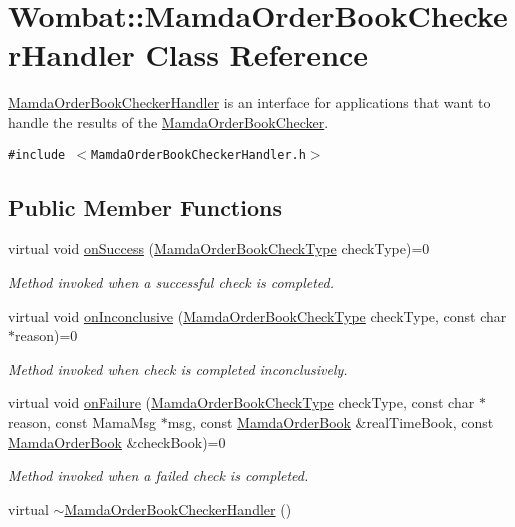 \hypertarget{classWombat_1_1MamdaOrderBookCheckerHandler}{
\section{Wombat::Mamda\-Order\-Book\-Checker\-Handler Class Reference}
\label{classWombat_1_1MamdaOrderBookCheckerHandler}
}
\hyperlink{classWombat_1_1MamdaOrderBookCheckerHandler}{Mamda\-Order\-Book\-Checker\-Handler} is an interface for applications that want to handle the results of the \hyperlink{classWombat_1_1MamdaOrderBookChecker}{Mamda\-Order\-Book\-Checker}.  


{\tt \#include $<$Mamda\-Order\-Book\-Checker\-Handler.h$>$}

\subsection*{Public Member Functions}
\begin{CompactItemize}
\item 
virtual void \hyperlink{classWombat_1_1MamdaOrderBookCheckerHandler_2ee6882d164d81f8e3adf8d469d32657}{on\-Success} (\hyperlink{namespaceWombat_6f15e7af875f3469c5fb0afe58b21667}{Mamda\-Order\-Book\-Check\-Type} check\-Type)=0
\begin{CompactList}\small\item\em Method invoked when a successful check is completed. \item\end{CompactList}\item 
virtual void \hyperlink{classWombat_1_1MamdaOrderBookCheckerHandler_c85eae2e0dfb1167f7cbec2a9204bea8}{on\-Inconclusive} (\hyperlink{namespaceWombat_6f15e7af875f3469c5fb0afe58b21667}{Mamda\-Order\-Book\-Check\-Type} check\-Type, const char $\ast$reason)=0
\begin{CompactList}\small\item\em Method invoked when check is completed inconclusively. \item\end{CompactList}\item 
virtual void \hyperlink{classWombat_1_1MamdaOrderBookCheckerHandler_66f7e02589afd6749e8765a80c997f4a}{on\-Failure} (\hyperlink{namespaceWombat_6f15e7af875f3469c5fb0afe58b21667}{Mamda\-Order\-Book\-Check\-Type} check\-Type, const char $\ast$reason, const Mama\-Msg $\ast$msg, const \hyperlink{classWombat_1_1MamdaOrderBook}{Mamda\-Order\-Book} \&real\-Time\-Book, const \hyperlink{classWombat_1_1MamdaOrderBook}{Mamda\-Order\-Book} \&check\-Book)=0
\begin{CompactList}\small\item\em Method invoked when a failed check is completed. \item\end{CompactList}\item 
virtual \hyperlink{classWombat_1_1MamdaOrderBookCheckerHandler_ea324a1e89bb217d77be13e807bcfa2a}{$\sim$Mamda\-Order\-Book\-Checker\-Handler} ()
\end{CompactItemize}


